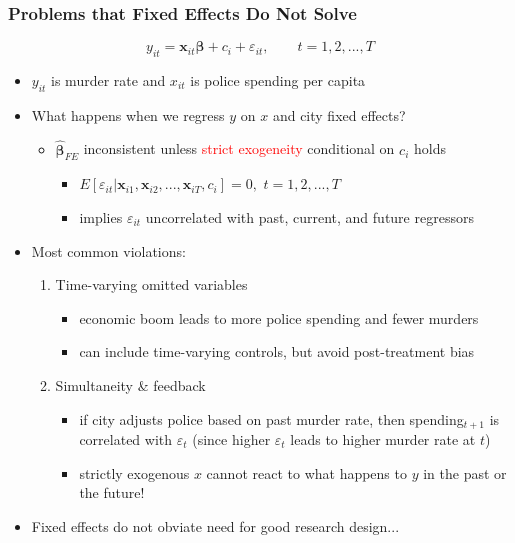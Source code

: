 \documentclass[xcolor=svgnames,9pt,english, aspectratio=169]{beamer}
\newcommand{\red}{\textcolor{red}}
\newcommand{\bs}{\boldsymbol}
\newcommand{\mb}{\mathbf}
\newcommand{\x}{\ensuremath{\mb{x}}}
\renewcommand{\b}{\ensuremath{\bs{\beta}}}
\newcommand{\bhat}{\ensuremath{\hat{\bs{\beta}}}}
\begin{document}
\begin{frame}
  \frametitle{Problems that Fixed Effects Do Not Solve}
  \small
\[
y_{it} = \x_{it}\b + c_i + \varepsilon_{it}, \quad \quad t=1,2,...,T
\]\vspace{-.2in}
\begin{itemize}
  \item $y_{it}$ is murder rate and $x_{it}$ is police spending per capita\medskip
  \item What happens when we regress $y$ on $x$ and city fixed effects?\pause
\begin{itemize}
  \item $\bhat_{FE}$ inconsistent unless \red{strict exogeneity} conditional on $c_i$ holds
      \begin{itemize}
      \item $E[\varepsilon_{it}|\x_{i1},\x_{i2},...,\x_{iT},c_i]=0, \,\,t=1,2,...,T$
  \item implies $\varepsilon_{it}$ uncorrelated with past, current, and future regressors
\end{itemize}
\end{itemize}\pause
  \item Most common violations:
  \begin{enumerate}
    \item \alert{Time-varying omitted variables}
    \begin{itemize}
      \item economic boom leads to more police spending and fewer murders
      \item can include time-varying controls, but avoid post-treatment bias
    \end{itemize}\pause
    \item \alert{Simultaneity \& feedback}
    \begin{itemize}
     \item if city adjusts police based on past murder rate, then spending$_{t+1}$ is correlated with $\varepsilon_{t}$ (since higher $\varepsilon_{t}$ leads to higher murder rate at $t$)
     \item strictly exogenous $x$ cannot react to what happens to $y$ in the past or the future!
\end{itemize}
  \end{enumerate}\pause
\item Fixed effects do not obviate need for good research design...
\end{itemize}
\end{frame}
\end{document}
